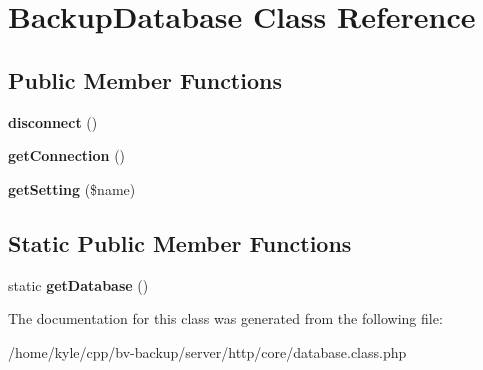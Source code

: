 \hypertarget{class_backup_database}{}\section{Backup\+Database Class Reference}
\label{class_backup_database}
\subsection*{Public Member Functions}
\begin{DoxyCompactItemize}
\item 
\mbox{\label{class_backup_database_a8f04f6cf7cf6c8a6635a5db3eb32a6f2}} 
{\bfseries disconnect} ()
\item 
\mbox{\label{class_backup_database_ae7c10f1130b39f2e77e2af4f2afa951d}} 
{\bfseries get\+Connection} ()
\item 
\mbox{\label{class_backup_database_ac9cf2430e87d8cbd7ec296c1f505e1a4}} 
{\bfseries get\+Setting} (\$name)
\end{DoxyCompactItemize}
\subsection*{Static Public Member Functions}
\begin{DoxyCompactItemize}
\item 
\mbox{\label{class_backup_database_a585876172d15c944234f9c1e47a3840b}} 
static {\bfseries get\+Database} ()
\end{DoxyCompactItemize}


The documentation for this class was generated from the following file\+:\begin{DoxyCompactItemize}
\item 
/home/kyle/cpp/bv-\/backup/server/http/core/database.\+class.\+php\end{DoxyCompactItemize}
